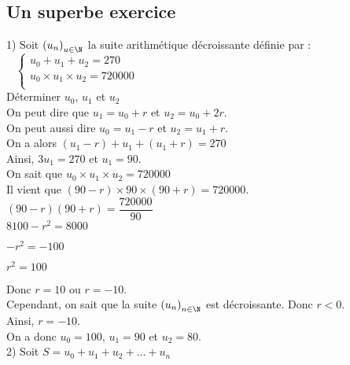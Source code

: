\newpage

\vspace*{-1cm}

\subsection{Un superbe exercice}

1) Soit $\left(u_n\right)_{u \in \N}$ la suite arithmétique décroissante définie par :$ \; \; \; \begin{cases}
u_0 + u_1 + u_2 = 270 \\
u_0 \times u_1 \times u_2 = 720 000 \\
\end{cases}$ \\

Déterminer $u_0$, $u_1$ et $u_2$ \\

On peut dire que $u_1 = u_0 + r$ et $u_2 = u_0 + 2r$. \\ On peut aussi dire $u_0 = u_1 - r$ et $u_2 = u_1 + r$. \\

On a alors $\left(u_1 - r\right) + u_1 + \left(u_1 + r\right) = 270$ \\

Ainsi, $3u_1 = 270$ et $u_1 = 90$. \\

On sait que $u_0 \times u_1 \times u_2 = 720 000$ \\

Il vient que $\left(90 - r\right) \times 90 \times \left(90+r\right) = 720 000$. \\

$\left(90-r\right)\left(90+r\right) = \dfrac{720 000}{90}$ \\

$8100 - r^2 = 8000$ 

$-r^2 = -100$ 

$r^2 = 100$ 

Donc $r = 10$ ou $r = -10$. \\

Cependant, on sait que la suite $\left(u_n\right)_{n \in \N}$ est décroissante. Donc $r < 0$. \\

Ainsi, $r = -10$. \\

On a donc $u_0 = 100$, $u_1 = 90$ et $u_2 = 80$. \\

2) Soit $S = u_0 + u_1 + u_2 + ... + u_n$ 

